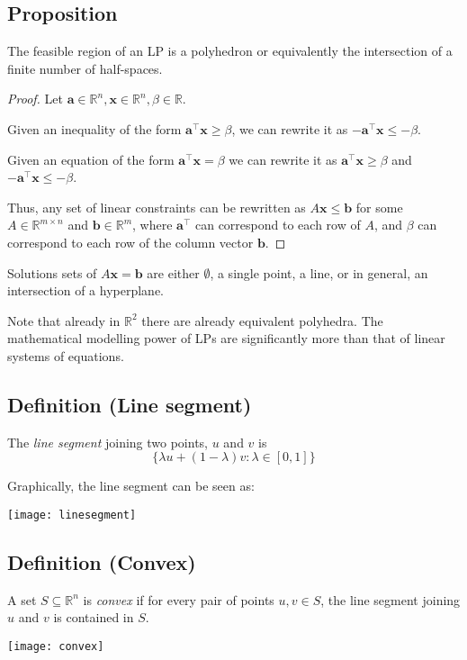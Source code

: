 \begin{thmbox}
    \subsection{Proposition}
    The feasible region of an LP is a polyhedron or equivalently the
    intersection of a finite number of half-spaces.
\end{thmbox}
\begin{proof}
    Let $ \bm{a}\in\mathbb{R}^n,\bm{x}\in\mathbb{R}^n,\beta\in \mathbb{R} $.

    Given an inequality of the form $ \bm{a} ^\top \bm{x}\ge \beta $, we can
    rewrite it as $ -\bm{a} ^\top \bm{x}\le -\beta $.

    Given an equation of the form $ \bm{a} ^\top \bm{x}=\beta $ we can rewrite it as
    $ \bm{a} ^\top \bm{x}\ge \beta $ and $ -\bm{a} ^\top \bm{x}\le -\beta $.

    Thus, any set of linear constraints can be rewritten as 
    $ A\bm{x}\le \bm{b} $ for some $ A\in \mathbb{R}^{m \times n} $ and $ \bm{b}\in \mathbb{R}^m $, where $ \bm{a}^\top $ can correspond to each row of $ A $,
    and $ \beta $ can correspond to each row of the column vector $ \bm{b} $.
\end{proof}

Solutions sets of $ A\bm{x}=\bm{b} $ are either $ \emptyset $, a single
point, a line, or in general, an intersection of a hyperplane.

Note that already in $ \mathbb{R}^2 $ there are already equivalent polyhedra.
The mathematical modelling power of LPs are significantly more than that of
linear systems of equations.

\begin{defbox}
    \subsection{Definition (Line segment)}
    The \emph{line segment} joining two points, $ u $ and $ v $ is
    \[ \{\lambda u + (1-\lambda)v:\lambda\in[0,1]\} \]
\end{defbox}
Graphically, the line segment can be seen as:
\begin{center}
    \texttt{[image: linesegment]}
\end{center}

\begin{defbox}
    \subsection{Definition (Convex)}
    A set $ S\subseteq \mathbb{R}^n $ is \emph{convex} if for 
    every pair of points $ u,v\in S $, the line segment joining $ u $ and $ v $
    is contained in $ S $.
\end{defbox}
\begin{center}
    \texttt{[image: convex]}
\end{center}


